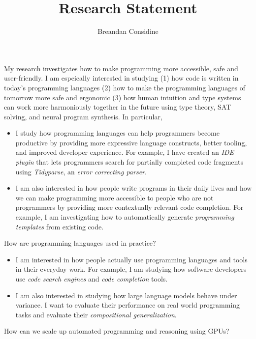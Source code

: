 \documentclass[11pt]{article}
\begin{document}
    \title{Research Statement}
    \author{Breandan Considine}
    \maketitle
    My research investigates how to make programming more accessible, safe and user-friendly. I am espeically interested in studying (1) how code is written in today's programming languages (2) how to make the programming languages of tomorrow more safe and ergonomic (3) how human intuition and type systems can work more harmoniously together in the future using type theory, SAT solving, and neural program synthesis. In particular,\\

    \begin{itemize}
        \item I study how programming languages can help programmers become productive by providing more expressive language constructs, better tooling, and improved developer experience. For example, I have created an \emph{IDE plugin} that lets programmers search for partially completed code fragments using \textit{Tidyparse}, an \textit{error correcting parser}.
        \item I am also interested in how people write programs in their daily lives and how we can make programming more accessible to people who are not programmers by providing more contextually relevant code completion. For example, I am investigating how to automatically generate \emph{programming templates} from existing code.
    \end{itemize}

    \noindent How are programming languages used in practice? \\

    \begin{itemize}
        \item I am interested in how people actually use programming languages and tools in their everyday work. For example, I am studying how software developers use \emph{code search engines} and \emph{code completion} tools.
        \item I am also interested in studying how large language models behave under variance. I want to evaluate their performance on real world programming tasks and evaluate their \textit{compositional generalization}.
    \end{itemize}

    \noindent How can we scale up automated programming and reasoning using GPUs?\\
\end{document}
